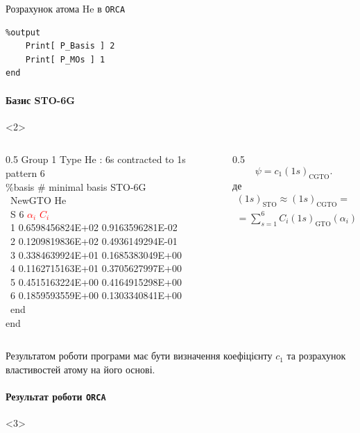\documentclass[10pt]{beamer}
\begin{document}
\begin{frame}[fragile]{Розрахунок атома He в \texttt{ORCA}}
\begin{onlyenv}
{\begin{verbatim}
%output
    Print[ P_Basis ] 2
    Print[ P_MOs ] 1
end
\end{verbatim}
		}
	\end{onlyenv}
	\framesubtitle<2>{Базис STO-6G}
	\begin{onlyenv}
		\begin{columns}
			\begin{column}{0.5\linewidth}
				\ttfamily\scriptsize\color{blue}
				Group   1 Type He  : 6s contracted to 1s pattern {6} \\[1em]
				\%basis \# minimal basis STO-6G \\
				\ NewGTO He\\
				\ S   6 \hspace*{8ex}\textcolor{red}{$\alpha_i$} \hspace*{14ex}\textcolor{red}{$C_i$}\\
				\ 1   0.6598456824E+02       0.9163596281E-02\\
				\ 2   0.1209819836E+02       0.4936149294E-01\\
				\ 3   0.3384639924E+01       0.1685383049E+00\\
				\ 4   0.1162715163E+01       0.3705627997E+00\\
				\ 5   0.4515163224E+00       0.4164915298E+00\\
				\ 6   0.1859593559E+00       0.1303340841E+00\\
				\ end\\
				end\\
			\end{column}
			\begin{column}{0.5\linewidth}
				\begin{equation*}\label{}
					\psi = c_1 (1s)_\text{CGTO}.
				\end{equation*}
				де
				\begin{multline*}
					(1s)_\text{STO} \approx  (1s)_\text{CGTO} = \\ = \sum_{s = 1}^6 C_i (1s)_\text{GTO} (\alpha_i)
				\end{multline*}
			\end{column}
		\end{columns}

		\bigskip

		\alert{Результатом роботи програми має бути визначення коефіцієнту $c_1$ та розрахунок властивостей атому на його основі.}
	\end{onlyenv}
	\framesubtitle<3-4>{Результат роботи \texttt{ORCA}}
	\begin{onlyenv}


\end{onlyenv}
\end{frame}
\end{document}
